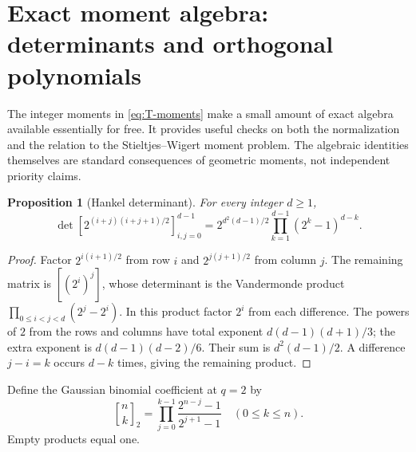 \documentclass[11pt,a4paper]{article}
\numberwithin{equation}{section}
\newtheorem{proposition}[proposition]{Proposition}
\theoremstyle{definition}
\theoremstyle{remark}
\newcommand{\qbinom}[3]{\genfrac{[}{]}{0pt}{}{#1}{#2}_{#3}}
\begin{document}
\section{Exact moment algebra: determinants and orthogonal polynomials}
\label{sec:orthogonal}
The integer moments in \cref{eq:T-moments} make a small amount of
exact algebra available essentially for free. It provides useful
checks on both the normalization and the relation to the
Stieltjes--Wigert moment problem. The algebraic identities themselves
are standard consequences of geometric moments, not independent
priority claims.

\begin{proposition}[Hankel determinant]
\label{prop:determinant}
For every integer $d\ge1$,
\begin{equation}
 \boxed{\displaystyle
 \det\left[2^{(i+j)(i+j+1)/2}\right]_{i,j=0}^{d-1}
 =2^{d^2(d-1)/2}\prod_{k=1}^{d-1}(2^k-1)^{d-k}.}
 \label{eq:hankel-exact}
\end{equation}
\end{proposition}
\begin{proof}
Factor $2^{i(i+1)/2}$ from row $i$ and
$2^{j(j+1)/2}$ from column $j$. The remaining matrix is
$[(2^i)^j]$, whose determinant is the Vandermonde product
$\prod_{0\le i<j<d}(2^j-2^i)$.
In this product factor $2^i$ from each difference. The powers of $2$
from the rows and columns have total exponent
$d(d-1)(d+1)/3$; the extra exponent is
$d(d-1)(d-2)/6$. Their sum is $d^2(d-1)/2$.
A difference $j-i=k$ occurs $d-k$ times, giving the remaining
product.
\end{proof}

Define the Gaussian binomial coefficient at $q=2$ by
\begin{equation}
 \qbinom nk2=\prod_{j=0}^{k-1}
                 \frac{2^{n-j}-1}{2^{j+1}-1}
 \quad(0\le k\le n).
 \label{eq:qbinom}
\end{equation}
Empty products equal one.
\end{document}
